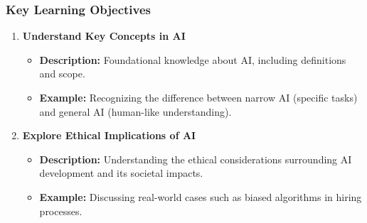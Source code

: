 \documentclass{beamer}
\begin{document}
\begin{frame}[fragile]
    \frametitle{Key Learning Objectives}
    \begin{enumerate}
        \item \textbf{Understand Key Concepts in AI}
            \begin{itemize}
                \item \textbf{Description:} Foundational knowledge about AI, including definitions and scope.
                \item \textbf{Example:} Recognizing the difference between narrow AI (specific tasks) and general AI (human-like understanding).
            \end{itemize}
        \item \textbf{Explore Ethical Implications of AI}
            \begin{itemize}
                \item \textbf{Description:} Understanding the ethical considerations surrounding AI development and its societal impacts.
                \item \textbf{Example:} Discussing real-world cases such as biased algorithms in hiring processes.
            \end{itemize}
    \end{enumerate}
\end{frame}
\end{document}
